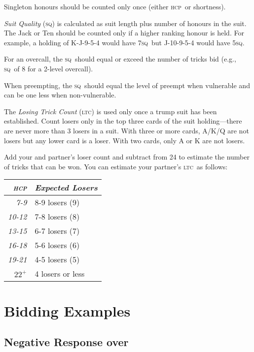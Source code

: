 \documentclass[a4paper,article,oneside]{memoir}
\newcommand{\gap}{\vspace{\baselineskip}}
\newcommand{\hcp}{\textsc{hcp}}
\newcommand{\sq}{\textsc{sq}}
\newcommand{\ltc}{\textsc{ltc}}
\begin{document}
Singleton honours should be counted only once (either \hcp\ or
shortness).

\gap

\emph{Suit Quality} (\sq) is calculated as suit length plus number of
honours in the suit. The Jack or Ten should be counted only if a
higher ranking honour is held. For example, a holding of K-J-9-5-4
would have 7\sq\ but J-10-9-5-4 would have 5\sq.

For an overcall, the \sq\ should equal or exceed the number of tricks
bid (e.g., \sq\ of 8 for a 2-level overcall).

When preempting, the \sq\ should equal the level of preempt when
vulnerable and can be one less when non-vulnerable.

\gap

The \emph{Losing Trick Count} (\ltc) is used only once a trump suit
has been established. Count losers only in the top three cards of the
suit holding---there are never more than 3 losers in a suit. With
three or more cards, A/K/Q are not losers but any lower card is a
loser. With two cards, only A or K are not losers.

Add your and partner's loser count and subtract from 24 to estimate
the number of tricks that can be won.  You can estimate your partner's
\ltc\ as follows:

\begin{tabular}{rp{3cm}}
  \emph{\hcp{}} & \emph{Expected Losers} \\
  \hline
  \emph{7-9} & 8-9 losers (9) \\
  \emph{10-12} & 7-8 losers (8) \\
  \emph{13-15} & 6-7 losers (7) \\
  \emph{16-18} & 5-6 losers (6) \\
  \emph{19-21} & 4-5 losers (5) \\
  \emph{$22^+$} & 4 losers or less \\
  \hline
\end{tabular}

\section{Bidding Examples}

\subsection{Negative Response over }
\end{document}
